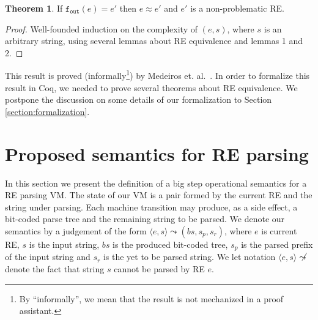 \documentclass[review]{elsarticle}
\newcommand{\fout}{\ensuremath{\texttt{f$_{\texttt{out}}$}}}
\theoremstyle{definition}
\newtheorem{Theorem}{Theorem}
\begin{document}
\begin{Theorem}
   If $\fout(e) = e'$ then $e \approx e'$ and $e'$ is a non-problematic RE.
\end{Theorem}
\begin{proof}
   Well-founded induction on the complexity of $(e,s)$, where $s$ is an arbitrary string, using
   several lemmas about RE equivalence and lemmas 1 and 2.
\end{proof}

This result is proved (informally\footnote{By ``informally'', we mean that the
  result is not mechanized in a proof assistant.}) by Medeiros et. al.~\cite{Medeiros14}. In order to formalize this result
in Coq, we needed to prove several theorems about RE equivalence. We postpone the discussion on some details
of our formalization to Section \ref{section:formalization}.


\section{Proposed semantics for RE parsing}\label{section:semantics}

In this section we present the definition of a big step operational semantics
for a RE parsing VM.
The state of our VM is a pair formed by the current RE and the string under parsing. Each machine 
transition may produce, as a side effect, a bit-coded parse tree and the remaining string to be 
parsed. We denote our semantics by a judgement of the form $\langle e, s \rangle \leadsto (bs,s_p,s_r)$,
where $e$ is current RE, $s$ is the input string, $bs$ is the produced bit-coded tree, $s_p$ is
the parsed prefix of the input string and $s_r$ is the yet to be parsed string.
We let notation $\langle e, s \rangle\not\leadsto$ denote the fact that string
$s$ cannot be parsed by RE $e$.
\end{document}
